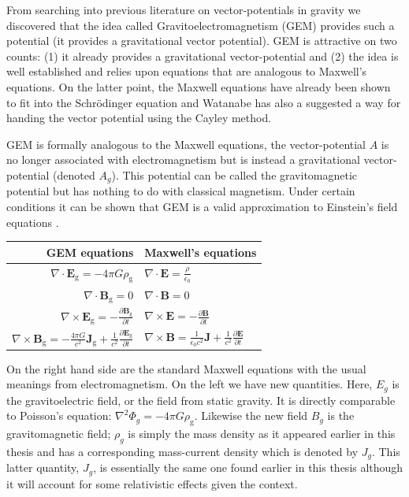 From searching into previous literature on vector-potentials in gravity we discovered that the idea called Gravitoelectromagnetism (GEM)  \citep{bib_gravito} provides such a potential (it provides a gravitational vector potential). GEM is attractive on two counts: (1) it already provides a gravitational vector-potential and (2) the idea is well established and relies upon equations that are analogous to Maxwell's equations. On the latter point, the Maxwell equations have already been shown to fit into the Schr\"odinger equation and Watanabe \citep{bib_wat2} has also a suggested a way for handing the vector potential using the Cayley method.

GEM is formally analogous to the Maxwell equations, the vector-potential $A$ is no longer associated with electromagnetism but is instead a gravitational vector-potential (denoted $A_g$). This potential can be called the gravitomagnetic potential but has nothing to do with classical magnetism. Under certain conditions it can be shown that GEM is a valid approximation to Einstein's field equations  \citep{bib_gravito}.

\vspace*{1cm}
\begin{center}
\begin{tabular}{|r|l|}
  \hline
  GEM equations & Maxwell's equations \\ \hline
$\nabla \cdot \mathbf{E}_\text{g} = -4 \pi G \rho_\text{g}$  & $\nabla \cdot \mathbf{E} =  \frac{\rho}{\epsilon_0}$ \\
$\nabla \cdot \mathbf{B}_\text{g} = 0$ & $\nabla \cdot \mathbf{B} = 0$ \\
$\nabla\times\mathbf{E}_\text{g}= -\frac{\partial\mathbf{B}_\text{g}}{\partial t}$& $\nabla\times\mathbf{E} = -\frac{\partial\mathbf{B}}{\partial t}$\\
$\nabla \times \mathbf{B}_\text{g} = -\frac{4 \pi G}{c^2} \mathbf{J}_\text{g} + \frac{1}{c^2} \frac{\partial \mathbf{E}_\text{g}} {\partial t}$ & $\nabla \times \mathbf{B} = \frac{1}{\epsilon_0 c^2} \mathbf{J} + \frac{1}{c^2} \frac{\partial \mathbf{E}} {\partial t}$ \\
  \hline
\end{tabular}
\end{center}
\vspace*{1cm}

\noindent On the right hand side are the standard Maxwell equations with the usual meanings from electromagnetism. On the left we have new quantities. Here, $E_g$ is the gravitoelectric field, or the field from static gravity. It is directly comparable to Poisson's equation: $\nabla^2 \Phi_g = -4 \pi G \rho_\text{g}$. Likewise the new field $B_g$ is the gravitomagnetic field; $\rho_g$ is simply the mass density as it appeared earlier in this thesis and has a corresponding mass-current density which is denoted by $J_g$. This latter quantity, $J_g$, is essentially the same one found earlier in this thesis although it will account for some relativistic effects given the context.

